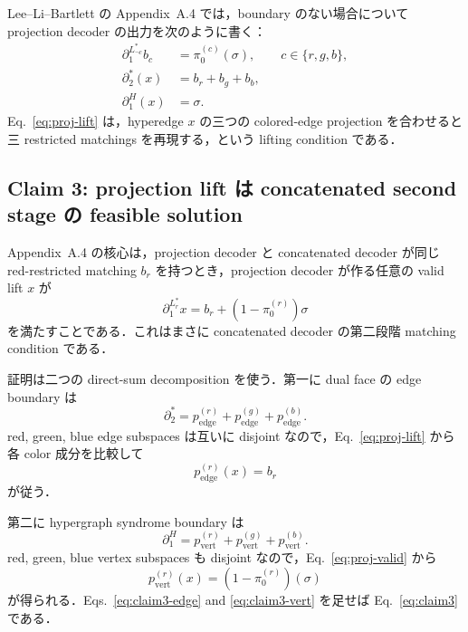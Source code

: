 \documentclass[a4paper,11pt]{ltjsarticle}
\newcommand{\bd}{\partial}
\begin{document}
Lee--Li--Bartlett の Appendix~A.4 では，boundary のない場合について projection decoder の出力を次のように書く：
\begin{align}
 \bd_1^{L^*_{\neg c}}b_c&=\pi_0^{(c)}(\sigma),\qquad c\in\{r,g,b\},
 \label{eq:proj-restricted}\\
 \bd_2^*(x)&=b_r+b_g+b_b,
 \label{eq:proj-lift}\\
 \bd_1^H(x)&=\sigma.
 \label{eq:proj-valid}
\end{align}
Eq.~\eqref{eq:proj-lift} は，hyperedge $x$ の三つの colored-edge projection を合わせると三 restricted matchings を再現する，という lifting condition である．

\subsection{Claim 3: projection lift は concatenated second stage の feasible solution}

Appendix~A.4 の核心は，projection decoder と concatenated decoder が同じ red-restricted matching $b_r$ を持つとき，projection decoder が作る任意の valid lift $x$ が
\begin{equation}
 \bd_1^{L^*_r}x=b_r+(1-\pi_0^{(r)})\sigma
 \label{eq:claim3}
\end{equation}
を満たすことである．これはまさに concatenated decoder の第二段階 matching condition である．

証明は二つの direct-sum decomposition を使う．第一に dual face の edge boundary は
\begin{equation}
 \bd_2^*=p_{\mathrm{edge}}^{(r)}+p_{\mathrm{edge}}^{(g)}+p_{\mathrm{edge}}^{(b)}.
 \label{eq:edge-decomposition}
\end{equation}
red, green, blue edge subspaces は互いに disjoint なので，Eq.~\eqref{eq:proj-lift} から各 color 成分を比較して
\begin{equation}
 p_{\mathrm{edge}}^{(r)}(x)=b_r
 \label{eq:claim3-edge}
\end{equation}
が従う．

第二に hypergraph syndrome boundary は
\begin{equation}
 \bd_1^H=p_{\mathrm{vert}}^{(r)}+p_{\mathrm{vert}}^{(g)}+p_{\mathrm{vert}}^{(b)}.
 \label{eq:vert-decomposition}
\end{equation}
red, green, blue vertex subspaces も disjoint なので，Eq.~\eqref{eq:proj-valid} から
\begin{equation}
 p_{\mathrm{vert}}^{(r)}(x)=(1-\pi_0^{(r)})(\sigma)
 \label{eq:claim3-vert}
\end{equation}
が得られる．Eqs.~\eqref{eq:claim3-edge} and \eqref{eq:claim3-vert} を足せば Eq.~\eqref{eq:claim3} である．
\end{document}
